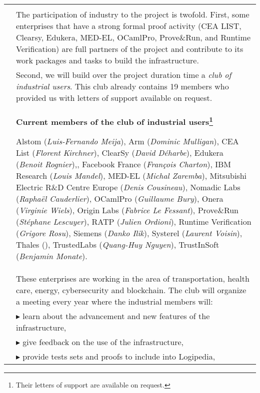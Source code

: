 \begin{longtable}{|p{}|p{}|}
&\\
&
\hspace{0.4cm}
The participation of industry to the project is twofold. First,
some enterprises that have a strong formal proof activity (CEA
LIST, Clearsy, Edukera, MED-EL, OCamlPro, Prove\&Run, 
and Runtime Verification) are full partners of the project and
contribute to its work packages and tasks to build the
infrastructure.
\\
&
\hspace{0.4cm}
Second, we will build over the project duration time a {\em club of
  industrial users}. This club already contains
19 members who provided us with letters of support available on request.
\\
&
\hspace{0.4cm}
\definecolor{shadecolor}{named}{color1}
\begin{shaded}
\begin{center}
  {\bf\large Current members of the club of industrial users\footnote{Their letters of support are available on request.}}
\end{center}
Alstom ({\it Luis-Fernando Meija}),
Arm ({\it Dominic Mulligan}),
CEA List ({\it Florent Kirchner}),
ClearSy ({\it David Déharbe}),
Edukera ({\it Benoit Rognier}),,
Facebook France ({\it François Charton}),
IBM Research ({\it Louis Mandel}),
MED-EL ({\it Michal Zaremba}),
Mitsubishi Electric R\&D Centre Europe ({\it Denis Cousineau}),
Nomadic Labs ({\it  Raphaël Cauderlier}),
OCamlPro ({\it Guillaume Bury}),
Onera ({\it Virginie Wiels}),
Origin Labs ({\it Fabrice Le Fessant}),
Prove\&Run ({\it Stéphane Lescuyer}),
RATP ({\it Julien Ordioni}),
Runtime Verification ({\it Grigore Rosu}),
Siemens ({\it Danko Ilik}),
Systerel ({\it Laurent Voisin}),
Thales (),
TrustedLabs ({\it Quang-Huy Nguyen}),
TrustInSoft ({\it Benjamin Monate}).
\end{shaded}\\
&
\hspace{0.4cm}
These enterprises are working in the area of transportation, health
care, energy, cybersecurity and blockchain.
The club will organize a meeting every year where the
industrial members will:\\
&
$\blacktriangleright$
learn about the advancement and new features of the infrastructure,\\
&
$\blacktriangleright$
give feedback on the use of the infrastructure,
\\
&
$\blacktriangleright$ provide tests sets and proofs to include into Logipedia,

\end{longtable}

